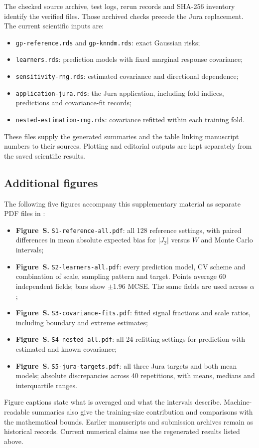 \documentclass[11pt,a4paper]{article}
\renewcommand{\thefigure}{S\arabic{figure}}
\begin{document}
The checked source archive, test logs, rerun records and SHA-256 inventory identify the verified files. Those archived checks precede the Jura replacement. The current scientific inputs are:
\begin{itemize}
\item \texttt{gp-reference.rds} and \texttt{gp-knndm.rds}: exact Gaussian risks;
\item \texttt{learners.rds}: prediction models with fixed marginal response covariance;
\item \texttt{sensitivity-rng.rds}: estimated covariance and directional dependence;
\item \texttt{application-jura.rds}: the Jura application, including fold indices, predictions and covariance-fit records;
\item \texttt{nested-estimation-rng.rds}: covariance refitted within each training fold.
\end{itemize}
These files supply the generated summaries and the table linking manuscript numbers to their sources. Plotting and editorial outputs are kept separately from the saved scientific results.

\subsection{Additional figures}
\label{sec:additional-figures}
The following five figures accompany this supplementary material as separate PDF files in :
\begin{itemize}
\item {}\label{fig:reference-all}\textbf{Figure~\thefigure.} \texttt{S1-reference-all.pdf}: all 128 reference settings, with paired differences in mean absolute expected bias for $|J_2|$ versus $W$ and Monte Carlo intervals;
\item {}\label{fig:learners-all}\textbf{Figure~\thefigure.} \texttt{S2-learners-all.pdf}: every prediction model, CV scheme and combination of scale, sampling pattern and target. Points average 60 independent fields; bars show $\pm1.96$ MCSE. The same fields are used across $\alpha$;
\item {}\label{fig:covariance-fits}\textbf{Figure~\thefigure.} \texttt{S3-covariance-fits.pdf}: fitted signal fractions and scale ratios, including boundary and extreme estimates;
\item {}\label{fig:nested-all}\textbf{Figure~\thefigure.} \texttt{S4-nested-all.pdf}: all 24 refitting settings for prediction with estimated and known covariance;
\item {}\label{fig:jura-targets}\textbf{Figure~\thefigure.} \texttt{S5-jura-targets.pdf}: all three Jura targets and both mean models; absolute discrepancies across 40 repetitions, with means, medians and interquartile ranges.
\end{itemize}
Figure captions state what is averaged and what the intervals describe. Machine-readable summaries also give the training-size contribution and comparisons with the mathematical bounds. Earlier manuscripts and submission archives remain as historical records. Current numerical claims use the regenerated results listed above.
\end{document}
